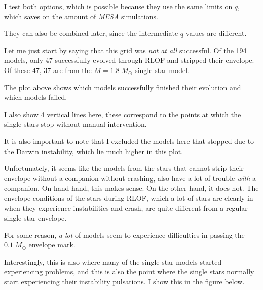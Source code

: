 \documentclass[a4paper,10pt]{article}
\begin{document}
I test both options, which is possible because they use the same limits on \(q\), which saves on the amount of \emph{MESA} simulations.

They can also be combined later, since the intermediate \(q\) values are different.


Let me just start by saying that this grid was \emph{not at all} successful. Of the 194 models, only 47 successfully evolved through RLOF and stripped their envelope.
Of these 47, 37 are from the \(M=1.8\;M_\odot \) single star model.

\begin{figure}[ht]
    \centering
\end{figure}

The plot above shows which models successfully finished their evolution and which models failed.

\begin{figure}[ht]
    \centering
\end{figure}

I also show 4 vertical lines here, these correspond to the points at which the single stars stop without manual intervention.

It is also important to note that I excluded the models here that stopped due to the Darwin instability, which lie much higher in this plot.

Unfortunately, it seems like the models from the stars that cannot strip their envelope without a companion without crashing, also have a lot of trouble \emph{with} a companion. On hand hand, this makes sense. On the other hand, it does not. The envelope conditions of the stars during RLOF, which a lot of stars are clearly in when they experience instabilities and crash, are quite different from a regular single star envelope.

For some reason, \emph{a lot} of models seem to experience difficulties in passing the \(0.1\;M_\odot \) envelope mark.

Interestingly, this is also where many of the single star models started experiencing problems, and this is also the point where the single stars normally start experiencing their instability pulsations. I show this in the figure below.

\begin{figure}[ht]
    \centering
\end{figure}
\end{document}
